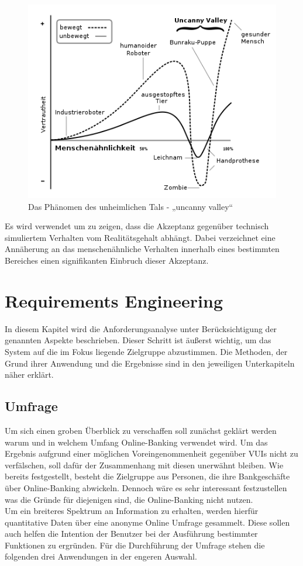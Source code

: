 \begin{figure}[!htb]
    \centering
    \includegraphics[width=1.0\textwidth]{bilder/3_uncannyValley.png}
    \caption{Das Phänomen des unheimlichen Tals -  „uncanny valley“}
    \label{fig:uncanny-valley}
\end{figure}

Es wird verwendet um zu zeigen, dass die Akzeptanz gegenüber technisch simuliertem Verhalten vom Realitätsgehalt abhängt. Dabei verzeichnet eine Annäherung an das menschenähnliche Verhalten innerhalb eines bestimmten Bereiches einen signifikanten Einbruch dieser Akzeptanz.

\section{Requirements Engineering}
\label{sec:requirements-engineering}
In diesem Kapitel wird die Anforderungsanalyse unter Berücksichtigung der genannten Aspekte beschrieben. Dieser Schritt ist äußerst wichtig, um das System auf die im Fokus liegende Zielgruppe abzustimmen. Die Methoden, der Grund ihrer Anwendung und die Ergebnisse sind in den jeweiligen Unterkapiteln näher erklärt.

\subsection{Umfrage}
\label{subsec:online-umfrage}
Um sich einen groben Überblick zu verschaffen soll zunächst geklärt werden warum und in welchem Umfang Online-Banking verwendet wird. Um das Ergebnis aufgrund einer möglichen Voreingenommenheit gegenüber \acp{VUI} nicht zu verfälschen, soll dafür der Zusammenhang mit diesen unerwähnt bleiben. Wie bereits festgestellt, besteht die Zielgruppe aus Personen, die ihre Bankgeschäfte über Online-Banking abwickeln. Dennoch wäre es sehr interessant festzustellen was die Gründe für diejenigen sind, die Online-Banking nicht nutzen.\\
Um ein breiteres Spektrum an Information zu erhalten, werden hierfür quantitative Daten über eine anonyme Online Umfrage gesammelt. Diese sollen auch helfen die Intention der Benutzer bei der Ausführung bestimmter Funktionen zu ergründen. Für die Durchführung der Umfrage stehen die folgenden drei Anwendungen in der engeren Auswahl. 

